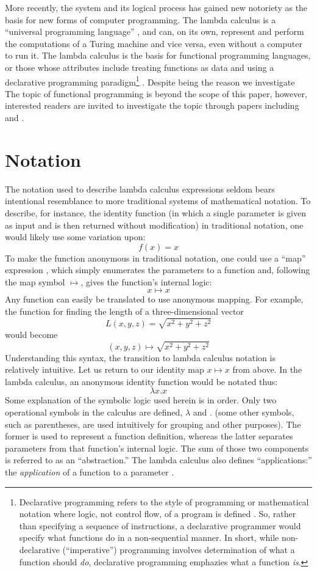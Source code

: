 \documentclass[twocolumn,titlepage,12pt]{article}
\begin{document}
More recently, the system and its logical process has gained new notoriety as the basis for new forms of computer programming. The lambda calculus is a ``universal programming language'' \cite{rojastutorial}, and can, on its own, represent and perform the computations of a Turing machine and vice versa, even without a computer to run it. The lambda calculus is the basis for functional programming languages, or those whose attributes include treating functions as data and using a declarative programming paradigm\footnote{Declarative programming refers to the style of programming or mathematical notation where logic, not control flow, of a program is defined \cite{declarativeprogadv}. So, rather than specifying a sequence of instructions, a declarative programmer would specify what functions do in a non-sequential manner. In short, while non-declarative (``imperative'') programming involves determination of what a function should \textit{do}, declarative programming emphazies what a function \textit{is}.} \cite{hudakevolution}. Despite being the reason we investigate The topic of functional programming is beyond the scope of this paper, however, interested readers are invited to investigate the topic through papers including \cite{totalfp} and \cite{hudakevolution}.

\section{Notation}
The notation used to describe lambda calculus expressions seldom bears intentional resemblance to more traditional systems of mathematical notation. To describe, for instance, the identity function (in which a single parameter is given as input and is then returned without modification) in traditional notation, one would likely use some variation upon:
$$f(x)=x$$
To make the function anonymous in traditional notation, one could use a ``map'' expression \cite{intrographtheory}, which simply enumerates the parameters to a function and, following the map symbol $\mapsto$, gives the function's internal logic:
$$x\mapsto x$$
Any function can easily be translated to use anonymous mapping. For example, the function for finding the length of a three-dimensional vector
$$L(x,y,z)=\sqrt{x^2+y^2+z^2}$$
would become
$$(x,y,z) \mapsto \sqrt{x^2+y^2+z^2}$$
Understanding this syntax, the transition to lambda calculus notation is relatively intuitive. Let us return to our identity map $x\mapsto x$ from above. In the lambda calculus, an anonymous identity function would be notated thus:
$$\lambda x.x$$
Some explanation of the symbolic logic used herein is in order. Only two operational symbols in the calculus are defined, $\lambda$ and $.$ (some other symbols, such as parentheses, are used intuitively for grouping and other purposes). The former is used to represent a function definition, whereas the latter separates parameters from that function's internal logic. The sum of those two components is referred to as an ``abstraction.'' The lambda calculus also defines ``applications:'' the \textit{application} of a function to a parameter \cite{horowitz}.
\end{document}
